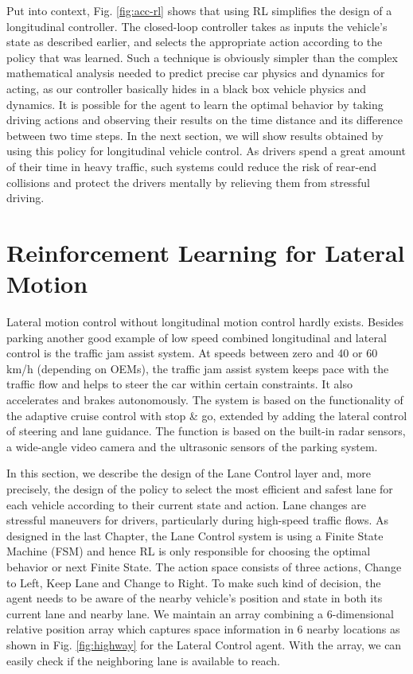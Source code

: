 Put into context, Fig. \ref{fig:acc-rl} shows that using RL simplifies the design of a longitudinal controller. The closed-loop controller takes as inputs the vehicle's state as described earlier, and selects the appropriate action according to the policy that was learned. Such a technique is obviously simpler than the complex mathematical analysis needed to predict precise car physics and dynamics for acting, as our controller basically hides in a black box vehicle physics and dynamics. It is possible for the agent to learn the optimal behavior by taking driving actions and observing their results on the time distance and its difference between two time steps. In the next section, we will show results obtained by using this policy for longitudinal vehicle control. As drivers spend a great amount of their time in heavy traffic, such systems could reduce the risk of rear-end collisions and protect the drivers mentally by relieving them from stressful driving.

\section{Reinforcement Learning for Lateral Motion}

Lateral motion control without longitudinal motion control hardly exists. Besides parking another good example of low speed combined longitudinal and lateral control is the traffic jam assist system. At speeds between zero and 40 or 60 km/h (depending on OEMs), the traffic jam assist system keeps pace with the traffic flow and helps to steer the car within certain constraints. It also accelerates and brakes autonomously. The system is based on the functionality of the adaptive cruise control with stop \& go, extended by adding the lateral control of steering and lane guidance. The function is based on the built-in radar sensors, a wide-angle video camera and the ultrasonic sensors of the parking system.

In this section, we describe the design of the Lane Control layer and, more precisely, the design of the policy to select the most efficient and safest lane for each vehicle according to their current state and action. Lane changes are stressful maneuvers for drivers, particularly during high-speed traffic flows. As designed in the last Chapter, the Lane Control system is using a Finite State Machine (FSM) and hence RL is only responsible for choosing the optimal behavior or next Finite State. The action space consists of three actions, Change to Left, Keep Lane and Change to Right. To make such kind of decision, the agent needs to be aware of the nearby vehicle's position and state in both its current lane and nearby lane. We maintain an array combining a 6-dimensional relative position array which captures space information in 6 nearby locations as shown in Fig. \ref{fig:highway} for the Lateral Control agent. With the array, we can easily check if the neighboring lane is available to reach.

